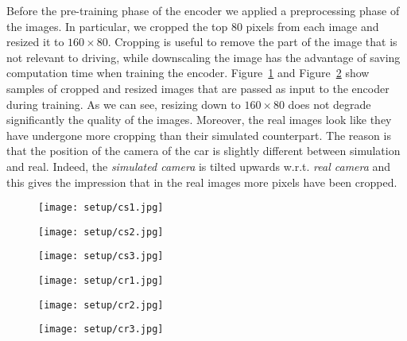 Before the pre-training phase of the encoder we applied a preprocessing phase of the images. In particular, we cropped the top 80 pixels from each image and resized it to $160 \times 80$. Cropping is useful to remove the part of the image that is not relevant to driving, while downscaling the image has the advantage of saving computation time when training the encoder. Figure~\ref{fig:datasetsimcropped} and Figure~\ref{fig:datasetrealcropped} show samples of cropped and resized images that are passed as input to the encoder during training. As we can see, resizing down to $160 \times 80$ does not degrade significantly the quality of the images. Moreover, the real images look like they have undergone more cropping than their simulated counterpart. The reason is that the position of the camera of the car is slightly different between simulation and real. Indeed, the \textit{simulated camera} is tilted upwards w.r.t. \textit{real camera} and this gives the impression that in the real images more pixels have been cropped.

\begin{figure}[h]
	\begin{minipage}{.33\textwidth}
		\centering
		\texttt{[image: setup/cs1.jpg]}
	\end{minipage}%
	\begin{minipage}{.33\textwidth}
		\centering
		\texttt{[image: setup/cs2.jpg]}
	\end{minipage}%
	\begin{minipage}{.33\textwidth}
		\centering
		\texttt{[image: setup/cs3.jpg]}
	\end{minipage}
	\label{fig:datasetsimcropped}
\end{figure}

\begin{figure}[h]
	\begin{minipage}{.33\textwidth}
		\centering
		\texttt{[image: setup/cr1.jpg]}
	\end{minipage}%
	\begin{minipage}{.33\textwidth}
		\centering
		\texttt{[image: setup/cr2.jpg]}
	\end{minipage}%
	\begin{minipage}{.33\textwidth}
		\centering
		\texttt{[image: setup/cr3.jpg]}
	\end{minipage}
	\label{fig:datasetrealcropped}
\end{figure}

